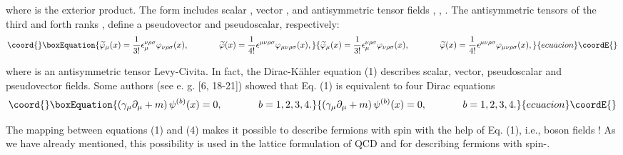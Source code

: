 \documentclass[a4paper,12pt]{article}
\begin{document}
where \myHighlight{$\wedge $}\coordHE{} is the exterior product. The form \myHighlight{$\Phi $}\coordHE{} includes
scalar \coordHE{}, vector \coordHE{}, and
antisymmetric tensor fields \coordHE{}, \coordHE{}, \coordHE{}. The
antisymmetric tensors of the third and forth ranks \coordHE{}, \coordHE{} define a
pseudovector and pseudoscalar, respectively:
\begin{equation}\coord{}\boxEquation{
\widetilde{\varphi }_\mu (x)=\frac 1{3!}\epsilon _\mu ^{\nu \rho
\sigma }\varphi _{\nu \rho \sigma
}(x),\hspace{0.5in}\widetilde{\varphi }(x)=\frac 1{4!}\epsilon
^{\mu \nu \rho \sigma }\varphi _{\mu \nu \rho \sigma }(x) ,
\label{3}
}{
\widetilde{\varphi }_\mu (x)=\frac 1{3!}\epsilon _\mu ^{\nu \rho
\sigma }\varphi _{\nu \rho \sigma
}(x),\hspace{0.5in}\widetilde{\varphi }(x)=\frac 1{4!}\epsilon
^{\mu \nu \rho \sigma }\varphi _{\mu \nu \rho \sigma }(x) ,
}{ecuacion}\coordE{}\end{equation}

where \myHighlight{$\epsilon ^{\mu \nu \rho \sigma }$}\coordHE{} is an antisymmetric tensor
Levy-Civita. In fact, the Dirac-K\"ahler equation (1) describes scalar,
vector, pseudoscalar and pseudovector fields. Some authors (see e. g. [6,
18-21]) showed that Eq. (1) is equivalent to four Dirac equations
\begin{equation}\coord{}\boxEquation{
\left( \gamma _\mu \partial _\mu +m\right) \psi ^{(b)}(x)=0 ,
\hspace{0.5in}b=1, 2, 3, 4 . \label{4}
}{
\left( \gamma _\mu \partial _\mu +m\right) \psi ^{(b)}(x)=0 ,
\hspace{0.5in}b=1, 2, 3, 4 . }{ecuacion}\coordE{}\end{equation}

The mapping between equations (1) and (4) makes it possible to describe
fermions with spin \coordHE{} with the help of Eq. (1), i.e., boson fields ! As
we have already mentioned, this possibility is used in the lattice
formulation of QCD and for describing fermions with spin-\coordHE{}.
\end{document}
